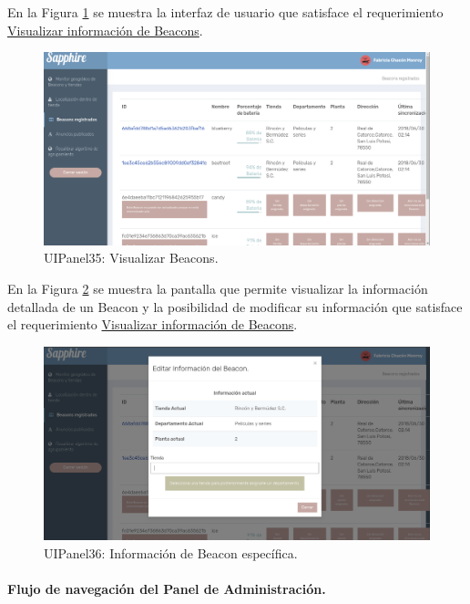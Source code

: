 En la Figura \ref{PA:beacons1} se muestra la interfaz de usuario que satisface el requerimiento \hyperlink{RFPA}{Visualizar información de Beacons}.
\FloatBarrier
\begin{figure}[htbp!]
		\centering
			\includegraphics[width=1 \textwidth]{imagenes/UI/prototipo3/beacons1}
		\caption{UIPanel35: Visualizar Beacons.}
		\label{PA:beacons1}
\end{figure}
\FloatBarrier

En la Figura \ref{PA:beacons2} se muestra la pantalla que permite visualizar la información detallada de un Beacon y la posibilidad de modificar su información que satisface el requerimiento \hyperlink{RFPA}{Visualizar información de Beacons}.
\FloatBarrier
\begin{figure}[htbp!]
		\centering
			\includegraphics[width=1 \textwidth]{imagenes/UI/prototipo3/beacons2}
		\caption{UIPanel36: Información de Beacon específica.}
		\label{PA:beacons2}
\end{figure}
\FloatBarrier


\paragraph{Flujo de navegación del Panel de Administración.} ~\\

